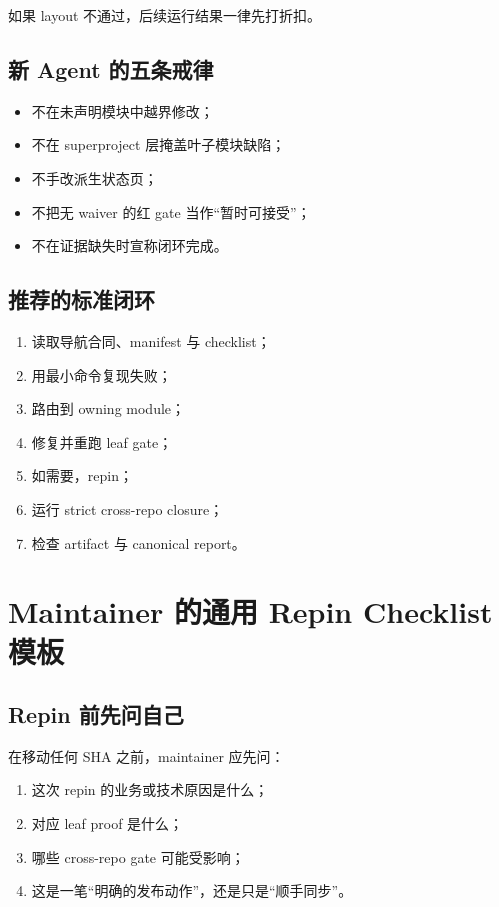 \documentclass[UTF8,11pt,a4paper,oneside]{ctexbook}
\begin{document}
如果 layout 不通过，后续运行结果一律先打折扣。

\section{新 Agent 的五条戒律}

\begin{itemize}
  \item 不在未声明模块中越界修改；
  \item 不在 superproject 层掩盖叶子模块缺陷；
  \item 不手改派生状态页；
  \item 不把无 waiver 的红 gate 当作“暂时可接受”；
  \item 不在证据缺失时宣称闭环完成。
\end{itemize}

\section{推荐的标准闭环}

\begin{enumerate}
  \item 读取导航合同、manifest 与 checklist；
  \item 用最小命令复现失败；
  \item 路由到 owning module；
  \item 修复并重跑 leaf gate；
  \item 如需要，repin；
  \item 运行 strict cross-repo closure；
  \item 检查 artifact 与 canonical report。
\end{enumerate}

\chapter{Maintainer 的通用 Repin Checklist 模板}

\section{Repin 前先问自己}

在移动任何 SHA 之前，maintainer 应先问：

\begin{enumerate}
  \item 这次 repin 的业务或技术原因是什么；
  \item 对应 leaf proof 是什么；
  \item 哪些 cross-repo gate 可能受影响；
  \item 这是一笔“明确的发布动作”，还是只是“顺手同步”。
\end{enumerate}
\end{document}
